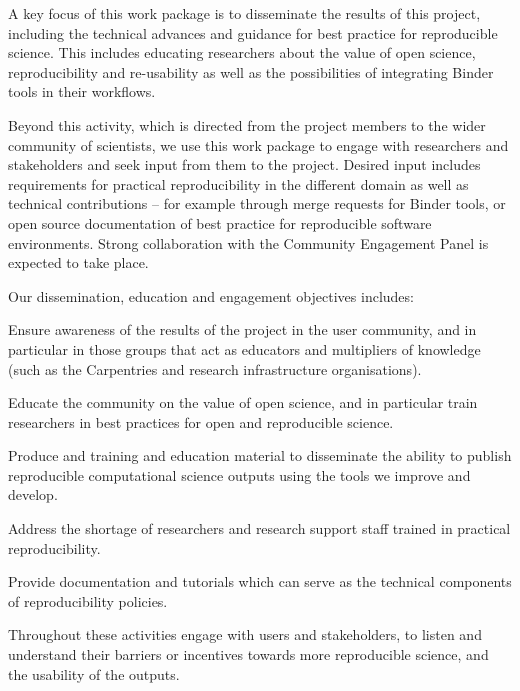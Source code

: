 \begin{workpackage}[id=education, wphases={0-12!0.48,12-24!0.48,24-36!0.71},
  title={Dissemination, education and engagement},
  short={Dissemination, education, and engagement},
  lead=IFR,
  IFRRM=10,
  MPRM=6,
  SRLRM=7,
  QSRM=3,
  UIORM=9,
  swsites
]


\begin{wpobjectives}
  A key focus of this work package is to disseminate the results of this
  project, including the technical advances and guidance for best practice for
  reproducible science. This includes educating researchers about the value of
  open science, reproducibility and re-usability as well as the possibilities of
  integrating Binder tools in their workflows.

  Beyond this activity, which is directed from the project members to the wider community of
  scientists, we use this work package to engage with researchers and
  stakeholders and seek input from them to the project. Desired input includes
  requirements for practical reproducibility in the different domain as well as
  technical contributions -- for example through merge requests for Binder
  tools, or open source documentation of best practice for reproducible software
  environments. Strong collaboration with the Community Engagement Panel is expected to take place.

  Our dissemination, education and engagement objectives includes:
 \begin{compactitem}
   \item Ensure awareness of the results of the project in the user community,
     and in particular in those groups that act as educators and multipliers of
     knowledge (such as the Carpentries and research infrastructure organisations).
   \item Educate the community on the value of open science, and in particular train researchers in best practices for open and reproducible science.
   \item Produce and training and education material to disseminate the ability to
     publish reproducible computational science outputs using the tools we
     improve and develop.
   \item Address the shortage of researchers and research support staff trained
     in practical reproducibility.
   \item Provide documentation and tutorials which can serve as the technical
     components of reproducibility policies.
   \item Throughout these activities engage with users and stakeholders, to
     listen and understand their barriers or incentives towards more
     reproducible science, and the usability of the \TheProject outputs.
 \end{compactitem}
\end{wpobjectives}


\end{workpackage}
